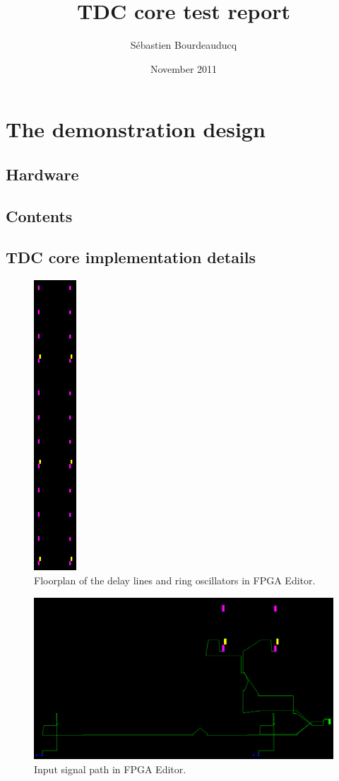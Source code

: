\documentclass[a4paper,11pt]{article}
\title{TDC core test report}
\author{S\'ebastien Bourdeauducq}
\date{November 2011}
\begin{document}
\setlength{\parindent}{0pt}
\setlength{\parskip}{5pt}
\maketitle{}
\section{The demonstration design}
\subsection{Hardware}

\subsection{Contents}

\subsection{TDC core implementation details}

\begin{figure}[!h]
\centering
\includegraphics[width=1.6cm]{floorplan.png}
\caption{Floorplan of the delay lines and ring oscillators in FPGA Editor.}
\label{fig:floorplan}
\end{figure}

\begin{figure}[!h]
\includegraphics[width=\textwidth]{input_routes.png}
\caption{Input signal path in FPGA Editor.}
\label{fig:inputpath}
\end{figure}
\end{document}

